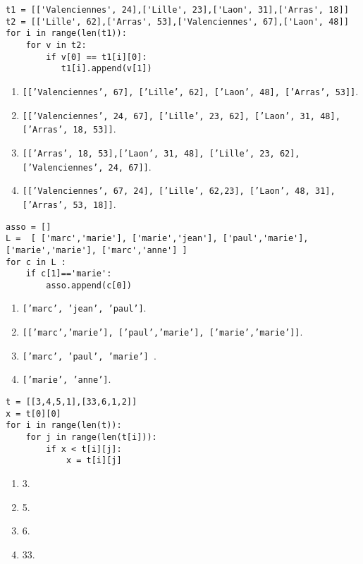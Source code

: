 \begin{lstlisting}
t1 = [['Valenciennes', 24],['Lille', 23],['Laon', 31],['Arras', 18]]
t2 = [['Lille', 62],['Arras', 53],['Valenciennes', 67],['Laon', 48]]
for i in range(len(t1)):
    for v in t2:
        if v[0] == t1[i][0]:
           t1[i].append(v[1])
\end{lstlisting}
\begin{enumerate}
\item \texttt{[['Valenciennes', 67], ['Lille', 62], ['Laon', 48], ['Arras', 53]]}.
\item \texttt{[['Valenciennes', 24, 67], ['Lille', 23, 62], ['Laon', 31, 48], ['Arras', 18, 53]]}. %
\item \texttt{[['Arras', 18, 53],['Laon', 31, 48], ['Lille', 23, 62], ['Valenciennes', 24, 67]]}.
\item \texttt{[['Valenciennes', 67, 24], ['Lille', 62,23], ['Laon', 48, 31], ['Arras', 53, 18]]}.
\end{enumerate}

\begin{lstlisting}
asso = []
L =  [ ['marc','marie'], ['marie','jean'], ['paul','marie'], ['marie','marie'], ['marc','anne'] ]
for c in L :
    if c[1]=='marie':
        asso.append(c[0])
\end{lstlisting}
\begin{enumerate}
\item \texttt{['marc', 'jean', 'paul']}.
\item \texttt{[['marc','marie'], ['paul','marie'], ['marie','marie']]}.
\item \texttt{['marc', 'paul', 'marie'] }.%
\item \texttt{['marie', 'anne']}.
\end{enumerate}

\begin{lstlisting}
t = [[3,4,5,1],[33,6,1,2]]
x = t[0][0]
for i in range(len(t)):
    for j in range(len(t[i])):
        if x < t[i][j]:
            x = t[i][j]
\end{lstlisting}
\begin{enumerate}
\item 3.
\item 5.
\item 6.
\item 33. %
\end{enumerate}
